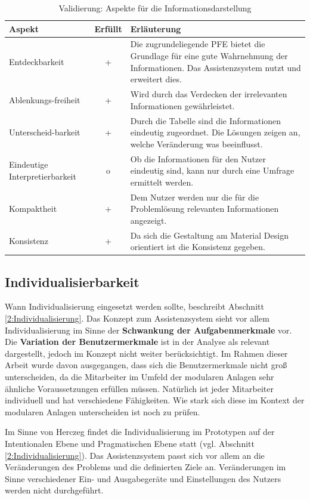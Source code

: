 \begin{table}[htb]
\caption{Validierung: Aspekte für die Informationsdarstellung}
\centering
\begin{tabular}{p{}|c|p{}}
\textbf{Aspekt} & \textbf{Erfüllt} & \textbf{Erläuterung} \\
\hline
Entdeckbarkeit & + & Die zugrundeliegende PFE bietet die Grundlage für eine gute Wahrnehmung der Informationen. Das Assistenzsystem nutzt und erweitert dies. \\
\hline
Ablenkungs-freiheit & + & Wird durch das Verdecken der irrelevanten Informationen gewährleistet. \\
\hline
Unterscheid-barkeit & + & Durch die Tabelle sind die Informationen eindeutig zugeordnet. Die Lösungen zeigen an, welche Veränderung was beeinflusst. \\
\hline
Eindeutige Interpretierbarkeit & o & Ob die Informationen für den Nutzer eindeutig sind, kann nur durch eine Umfrage ermittelt werden.\\
\hline
Kompaktheit & + & Dem Nutzer werden nur die für die Problemlösung relevanten Informationen angezeigt. \\
\hline
Konsistenz & + & Da sich die Gestaltung am Material Design orientiert ist die Konsistenz gegeben. \\
\end{tabular}
\label{tab:Validierung-Informationsdarstellung}
\end{table}


\subsection*{Individualisierbarkeit}
Wann Individualisierung eingesetzt werden sollte, beschreibt Abschnitt \ref{2:Individualisierung}. Das Konzept zum Assistenzsystem sieht vor allem Individualisierung im Sinne der \textbf{Schwankung der Aufgabenmerkmale} vor. Die \textbf{Variation der Benutzermerkmale} ist in der Analyse als relevant dargestellt, jedoch im Konzept nicht weiter berücksichtigt. Im Rahmen dieser Arbeit wurde davon ausgegangen, dass sich die Benutzermerkmale nicht groß unterscheiden, da die Mitarbeiter im Umfeld der modularen Anlagen sehr ähnliche Voraussetzungen erfüllen müssen. Natürlich ist jeder Mitarbeiter individuell und hat verschiedene Fähigkeiten. Wie stark sich diese im Kontext der modularen Anlagen unterscheiden ist noch zu prüfen.

Im Sinne von Herczeg \cite{Herczeg2006} findet die Individualisierung im Prototypen auf der Intentionalen Ebene und Pragmatischen Ebene statt (vgl. Abschnitt \ref{2:Individualisierung}). Das Assistenzsystem passt sich vor allem an die Veränderungen des Problems und die definierten Ziele an. Veränderungen im Sinne verschiedener Ein- und Ausgabegeräte und Einstellungen des Nutzers werden nicht durchgeführt.

